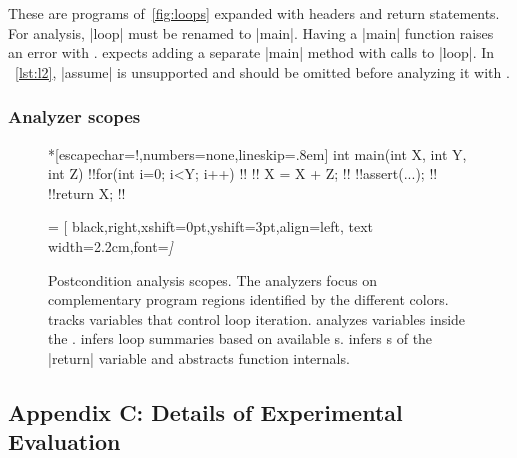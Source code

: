 These are programs of~\autoref{fig:loops} expanded with headers and return statements. For  analysis, \pr|loop| must be
renamed to \pr|main|. Having a \pr|main| function raises an error with
\@.  expects adding a separate \pr|main| method with calls
to \pr|loop|. In ~\autoref{lst:l2}, \pr|assume| is unsupported and should be
omitted before analyzing it with \@.

\subsubsection{Analyzer scopes}\label{subsec:analyzer-scopes}

\begin{figure}[H]
\begin{center}
\begin{minipage}{.7\textwidth}
\begin{outlisting}*[escapechar=!,numbers=none,lineskip=.8em]
int main(int X, int Y, int Z) {
    !!for(int i=0; i<Y; i++)              !!
    !!   X = X + Z;                       !!
    !!assert(...);                        !!
    !!return X;                           !!
}
\end{outlisting}
 = [
    black,right,xshift=0pt,yshift=3pt,align=left,
    text width=2.2cm,font=\itshape]
\end{minipage}
\end{center}
\caption[Postcondition analysis scopes]{
Postcondition analysis scopes. The analyzers focus on
complementary program regions identified by the different colors. 
tracks variables that control loop iteration. \ndx{\impl} analyzes variables
inside the .  infers loop summaries based on available
s.  infers s of the \pr|return|
variable and abstracts function internals.
}
\label{fig:comp-scope}
\end{figure}%

\subsection{Appendix C: Details of Experimental Evaluation}
\label{app:subsec:bench}

